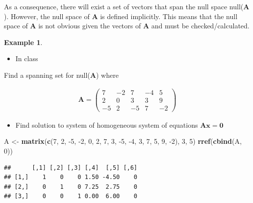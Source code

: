 \documentclass[
]{book}
\newenvironment{Shaded}{\begin{snugshade}}{\end{snugshade}}
\newcommand{\DecValTok}[1]{\textcolor[rgb]{0.00,0.00,0.81}{#1}}
\newcommand{\KeywordTok}[1]{\textcolor[rgb]{0.13,0.29,0.53}{\textbf{#1}}}
\newcommand{\NormalTok}[1]{#1}
\newcommand{\StringTok}[1]{\textcolor[rgb]{0.31,0.60,0.02}{#1}}
\providecommand{\tightlist}{%
  \setlength{\itemsep}{0pt}\setlength{\parskip}{0pt}}
\theoremstyle{definition}
\theoremstyle{definition}
\newtheorem{example}{Example}[chapter]
\theoremstyle{definition}
\theoremstyle{remark}
\begin{document}
As a consequence, there will exist a set of vectors that span the null space null(\(\mathbf{A}\)). However, the null space of \(\mathbf{A}\) is defined implicitly. This means that the null space of \(\mathbf{A}\) is not obvious given the vectors of \(\mathbf{A}\) and must be checked/calculated.

\begin{example}
\protect\hypertarget{exm:unlabeled-div-120}{}\label{exm:unlabeled-div-120}

\begin{itemize}
\tightlist
\item
  In class
\end{itemize}

Find a spanning set for null(\(\mathbf{A}\)) where

\[
\begin{aligned}
\mathbf{A} = \begin{pmatrix} 7 & -2 & 7 & -4 & 5 \\ 2 & 0 & 3 & 3 & 9 \\ -5 & 2 & -5 & 7 & -2 \end{pmatrix}
\end{aligned}
\]

\begin{itemize}
\tightlist
\item
  Find solution to system of homogeneous system of equations \(\mathbf{A} \mathbf{x} = \mathbf{0}\)
\end{itemize}

\begin{Shaded}
\begin{Highlighting}[]
\NormalTok{A <-}\StringTok{ }\KeywordTok{matrix}\NormalTok{(}\KeywordTok{c}\NormalTok{(}\DecValTok{7}\NormalTok{, }\DecValTok{2}\NormalTok{, }\DecValTok{-5}\NormalTok{, }\DecValTok{-2}\NormalTok{, }\DecValTok{0}\NormalTok{, }\DecValTok{2}\NormalTok{, }\DecValTok{7}\NormalTok{, }\DecValTok{3}\NormalTok{, }\DecValTok{-5}\NormalTok{, }\DecValTok{-4}\NormalTok{, }\DecValTok{3}\NormalTok{, }\DecValTok{7}\NormalTok{, }\DecValTok{5}\NormalTok{, }\DecValTok{9}\NormalTok{, }\DecValTok{-2}\NormalTok{), }\DecValTok{3}\NormalTok{, }\DecValTok{5}\NormalTok{)}
\KeywordTok{rref}\NormalTok{(}\KeywordTok{cbind}\NormalTok{(A, }\DecValTok{0}\NormalTok{))}
\end{Highlighting}
\end{Shaded}

\begin{verbatim}
##      [,1] [,2] [,3] [,4]  [,5] [,6]
## [1,]    1    0    0 1.50 -4.50    0
## [2,]    0    1    0 7.25  2.75    0
## [3,]    0    0    1 0.00  6.00    0
\end{verbatim}


\end{example}
\end{document}
